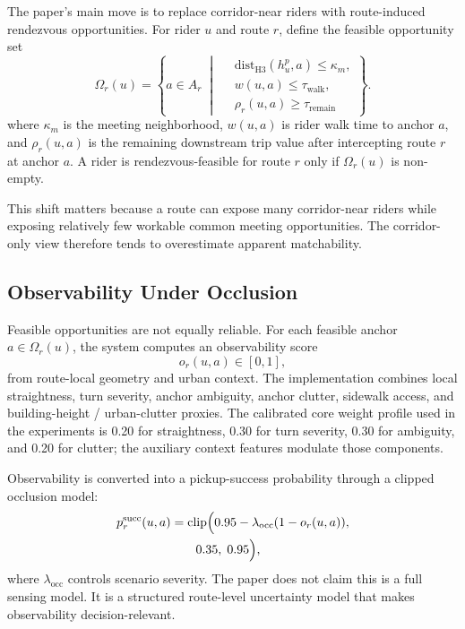 \documentclass[journal]{IEEEtran}
\begin{document}
The paper's main move is to replace corridor-near riders with route-induced rendezvous opportunities. For rider $u$ and route $r$, define the feasible opportunity set
\begin{equation}
\Omega_r(u) =
\left\{ a \in A_r \;\middle|\;
\begin{aligned}
&\mathrm{dist}_{\mathrm{H3}}(h_u^p,a) \le \kappa_m,\\
&w(u,a) \le \tau_{\mathrm{walk}},\\
&\rho_r(u,a) \ge \tau_{\mathrm{remain}}
\end{aligned}
\right\}.
\end{equation}
where $\kappa_m$ is the meeting neighborhood, $w(u,a)$ is rider walk time to anchor $a$, and $\rho_r(u,a)$ is the remaining downstream trip value after intercepting route $r$ at anchor $a$. A rider is rendezvous-feasible for route $r$ only if $\Omega_r(u)$ is non-empty.

This shift matters because a route can expose many corridor-near riders while exposing relatively few workable common meeting opportunities. The corridor-only view therefore tends to overestimate apparent matchability.

\subsection{Observability Under Occlusion}
Feasible opportunities are not equally reliable. For each feasible anchor $a \in \Omega_r(u)$, the system computes an observability score
\begin{equation}
o_r(u,a) \in [0,1],
\end{equation}
from route-local geometry and urban context. The implementation combines local straightness, turn severity, anchor ambiguity, anchor clutter, sidewalk access, and building-height / urban-clutter proxies. The calibrated core weight profile used in the experiments is 0.20 for straightness, 0.30 for turn severity, 0.30 for ambiguity, and 0.20 for clutter; the auxiliary context features modulate those components.

Observability is converted into a pickup-success probability through a clipped occlusion model:
\begin{equation}
\begin{aligned}
p_r^{\mathrm{succ}}(u,a)
&= \operatorname{clip}\Bigl(0.95 - \lambda_{\mathrm{occ}}(1-o_r(u,a)),\\
&\qquad 0.35,\; 0.95\Bigr),
\end{aligned}
\end{equation}
where $\lambda_{\mathrm{occ}}$ controls scenario severity. The paper does not claim this is a full sensing model. It is a structured route-level uncertainty model that makes observability decision-relevant.
\end{document}
